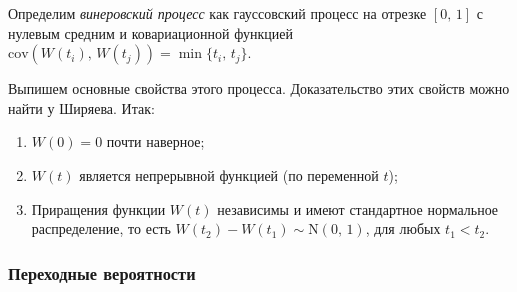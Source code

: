 \begin{definition}
        Определим \textit{винеровский процесс} как гауссовский процесс на отрезке $[0,\,1]$ с нулевым средним и ковариационной функцией $\mbox{cov}(W(t_i),\,W(t_j)) = \min\{t_i,\,t_j\}$.
\end{definition}

Выпишем основные свойства этого процесса. Доказательство этих свойств можно найти у Ширяева. Итак:
\begin{enumerate}
        \item $W(0) = 0$ почти наверное;
        \item $W(t)$ является непрерывной функцией (по переменной $t$);
        \item Приращения функции $W(t)$ независимы и имеют стандартное нормальное распределение, то есть $W(t_2) - W(t_1) \sim \mbox{N}(0,\,1)$, для любых $t_1 < t_2$.
\end{enumerate}

\subsubsection{Переходные вероятности}

